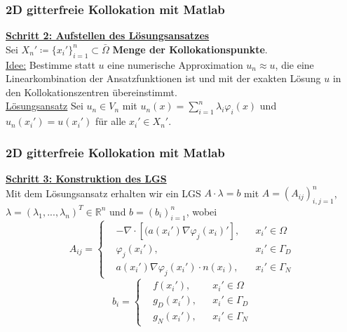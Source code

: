 \documentclass{beamer}
\begin{document}
\begin{frame}[fragile]
\frametitle{2D gitterfreie Kollokation mit Matlab} %
\underline{\textbf{Schritt 2: Aufstellen des Lösungsansatzes}}\\
Sei $X_{n}' \coloneq \{x_{i}' \}_{i=1}^{n} \subset \bar{\Omega}$ \textbf{Menge der Kollokationspunkte}.\\
\underline{Idee:} Bestimme statt $u$ eine numerische Approximation $u_{n} \approx u$, die eine Linearkombination der Ansatzfunktionen ist und mit der exakten Lösung $u$ in den Kollokationszentren übereinstimmt.\\
\underline{Lösungsansatz} Sei $u_{n} \in V_{n}$ mit $u_{n}(x) = \sum\limits_{i=1}^{n} \lambda_{i}\varphi_{i}(x)$ und $u_{n}(x_{i}') = u(x_{i}')$ für alle $x_{i}' \in X_{n}'$.
\end{frame}

\begin{frame}[fragile]
\frametitle{2D gitterfreie Kollokation mit Matlab} %
\underline{\textbf{Schritt 3: Konstruktion des LGS}}\\
Mit dem Lösungsansatz erhalten wir ein LGS $A \cdot \lambda = b$ mit $A = (A_{ij})_{i,j=1}^{n}$, $\lambda = (\lambda_{1},...,\lambda_{n})^{T} \in \mathbb{R}^{n}$ und $b = (b_{i})_{i=1}^{n}$, wobei
\begin{equation*}
 A_{ij}=
 \left\{
 \begin{aligned}
	&-\nabla \cdot [(a(x_{i}')\nabla \varphi_{j}(x_{i})'], && x_{i}' \in \Omega \\
	&\varphi_{j}(x_{i}'),  && x_{i}' \in \Gamma_{D} \\
	&a(x_{i}')\nabla \varphi_{j}(x_{i}') \cdot n(x_{i}), && x_{i}' \in \Gamma_{N} 
	\end{aligned}
	\right.
\end{equation*}
\begin{equation*}
 b_{i}=
 \left\{
 \begin{aligned}
	&f(x_{i}'), && x_{i}' \in \Omega \\
	&g_{D}(x_{i}'),  && x_{i}' \in \Gamma_{D} \\
	&g_{N}(x_{i}'), && x_{i}' \in \Gamma_{N}
	\end{aligned}
	\right.
\end{equation*}
\end{frame}
\end{document}
